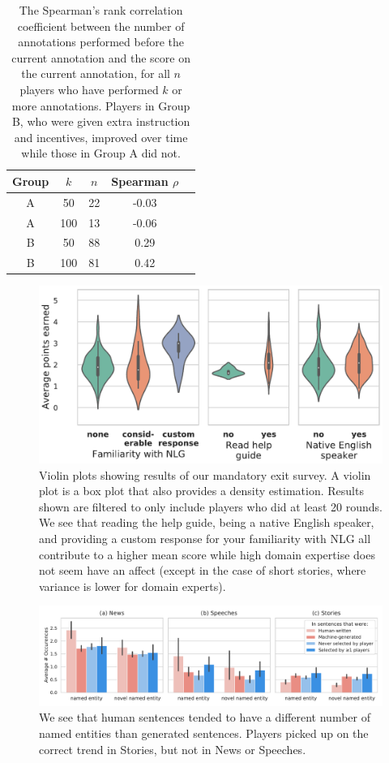 \begin{table}[tb]
\small
\centering
\begin{tabular}{SSSSS} \toprule
    {Group} & {$k$} & {$n$} & {Spearman $\rho$}\\ \midrule
    {A} & {50} & {22} & {-0.03} \\
    {A} & {100} & {13} & {-0.06}  \\
    \midrule
    {B} & {50} & {88} & {0.29} \\
    {B} & {100} & {81} & {0.42} \\
    \bottomrule
\end{tabular}
\caption{The Spearman's rank correlation coefficient between the number of annotations performed before the current annotation and the score on the current annotation, for all $n$ players who have performed $k$ or more annotations. Players in Group B, who were given extra instruction and incentives, improved over time while those in Group A did not.}
\label{tab:correlation_over_time}
\end{table}

\begin{figure}[tb]
    \centering
    \includegraphics[width=0.5\linewidth]{figures/survey_results_no_fam.pdf}
    \caption{Violin plots showing results of our mandatory exit survey. A violin plot is a box plot that also provides a density estimation. Results shown are filtered to only include players who did at least 20 rounds. We see that reading the help guide, being a native English speaker, and providing a custom response for your familiarity with NLG all contribute to a higher mean score while high domain expertise does not seem have an affect (except in the case of short stories, where variance is lower for domain experts).}
    \label{fig:survey_results}
\end{figure}

\begin{figure}[tb]
    \centering
    \includegraphics[width=\linewidth]{figures/ner_stats.pdf}
    \caption{We see that human sentences tended to have a different number of named entities than generated sentences.
    Players picked up on the correct trend in Stories, but not in News or Speeches.}
    \label{fig:sentence_stats}
\end{figure}

